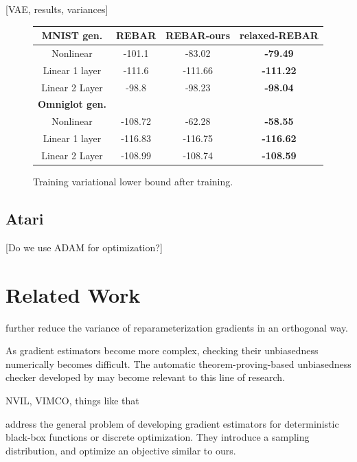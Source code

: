 \documentclass{article}
\begin{document}
[VAE, results, variances]
\begin{figure}
\begin{center}
 \begin{tabular}{|c|c c c||} 
 \hline
 \textbf{MNIST gen.} & REBAR \citep{tucker2017rebar} & REBAR-ours & relaxed-REBAR \\ [0.5ex] 
 \hline
  Nonlinear         & -101.1  &  -83.02 &  \textbf{-79.49} \\
 Linear 1 layer   & -111.6 & -111.66 & \textbf{-111.22} \\ 
 Linear 2 Layer & -98.8  & -98.23 & \textbf{-98.04} \\
 \hline\hline
 \textbf{Omniglot gen.} &&&\\
 \hline
 Nonlinear         & -108.72  & -62.28 & \textbf{-58.55} \\
 Linear 1 layer   & -116.83  & -116.75 & \textbf{-116.62} \\ 
 Linear 2 Layer & -108.99  & -108.74 & \textbf{-108.59} \\
 \hline
\end{tabular}
\end{center}
\label{tab:vae}
\caption{Training variational lower bound after training.}
\end{figure}


\subsection{Atari}

\citet{mnih-dqn-2015}

[Do we use ADAM \citep{kingma2015adam} for optimization?]





\section{Related Work}
\label{related work}

\citet{miller2017reducing} further reduce the variance of reparameterization gradients in an orthogonal way.

As gradient estimators become more complex, checking their unbiasedness numerically becomes difficult.
The automatic theorem-proving-based unbiasedness checker developed by \citet{selsam2017developing} may become relevant to this line of research.

NVIL, VIMCO, things like that

\citet{staines2012variational} address the general problem of developing gradient estimators for deterministic black-box functions or discrete optimization.
They introduce a sampling distribution, and optimize an objective similar to ours. 
\end{document}
